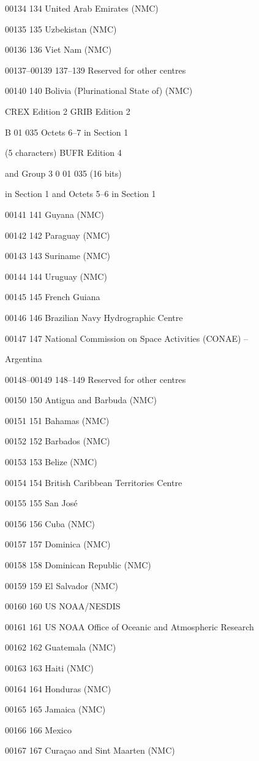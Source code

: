 00134 134 United Arab Emirates (NMC)

00135 135 Uzbekistan (NMC)

00136 136 Viet Nam (NMC)

00137--00139 137--139 Reserved for other centres

00140 140 Bolivia (Plurinational State of) (NMC)

CREX Edition 2 GRIB Edition 2

B 01 035 Octets 6--7 in Section 1

(5 characters) BUFR Edition 4

and Group 3 0 01 035 (16 bits)

in Section 1 and Octets 5--6 in Section 1

00141 141 Guyana (NMC)

00142 142 Paraguay (NMC)

00143 143 Suriname (NMC)

00144 144 Uruguay (NMC)

00145 145 French Guiana

00146 146 Brazilian Navy Hydrographic Centre

00147 147 National Commission on Space Activities (CONAE) --

Argentina

00148--00149 148--149 Reserved for other centres

00150 150 Antigua and Barbuda (NMC)

00151 151 Bahamas (NMC)

00152 152 Barbados (NMC)

00153 153 Belize (NMC)

00154 154 British Caribbean Territories Centre

00155 155 San José

00156 156 Cuba (NMC)

00157 157 Dominica (NMC)

00158 158 Dominican Republic (NMC)

00159 159 El Salvador (NMC)

00160 160 US NOAA/NESDIS

00161 161 US NOAA Office of Oceanic and Atmospheric Research

00162 162 Guatemala (NMC)

00163 163 Haiti (NMC)

00164 164 Honduras (NMC)

00165 165 Jamaica (NMC)

00166 166 Mexico

00167 167 Curaçao and Sint Maarten (NMC)

